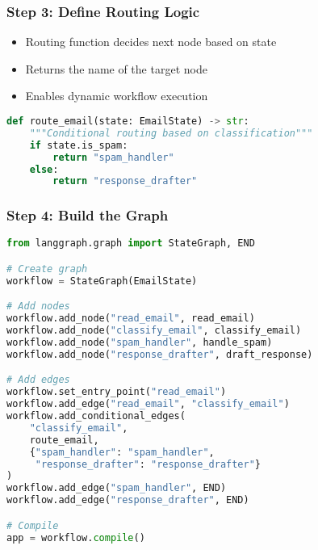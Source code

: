 \begin{frame}[fragile]\frametitle{Step 3: Define Routing Logic}

      \begin{itemize}
        \item Routing function decides next node based on state
        \item Returns the name of the target node
        \item Enables dynamic workflow execution
      \end{itemize}
	  
      \begin{lstlisting}[language=Python, basicstyle=\tiny]
def route_email(state: EmailState) -> str:
    """Conditional routing based on classification"""
    if state.is_spam:
        return "spam_handler"
    else:
        return "response_drafter"
      \end{lstlisting}
      

\end{frame}

\begin{frame}[fragile]\frametitle{Step 4: Build the Graph}
      \begin{lstlisting}[language=Python, basicstyle=\tiny]
from langgraph.graph import StateGraph, END

# Create graph
workflow = StateGraph(EmailState)

# Add nodes
workflow.add_node("read_email", read_email)
workflow.add_node("classify_email", classify_email)
workflow.add_node("spam_handler", handle_spam)
workflow.add_node("response_drafter", draft_response)

# Add edges
workflow.set_entry_point("read_email")
workflow.add_edge("read_email", "classify_email")
workflow.add_conditional_edges(
    "classify_email",
    route_email,
    {"spam_handler": "spam_handler", 
     "response_drafter": "response_drafter"}
)
workflow.add_edge("spam_handler", END)
workflow.add_edge("response_drafter", END)

# Compile
app = workflow.compile()
      \end{lstlisting}
\end{frame}

